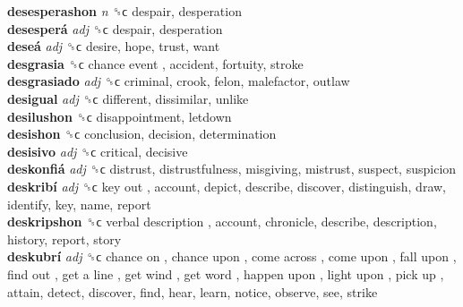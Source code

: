 \textbf{desesperashon} \emph{n}  ␝ϲ  despair, desperation  \\
\textbf{desesperá} \emph{adj}  ␝ϲ  despair, desperation  \\
\textbf{deseá} \emph{adj}  ␝ϲ  desire, hope, trust, want  \\
\textbf{desgrasia} ␝ϲ   chance event , accident, fortuity, stroke  \\
\textbf{desgrasiado} \emph{adj}  ␝ϲ  criminal, crook, felon, malefactor, outlaw  \\
\textbf{desigual} \emph{adj}  ␝ϲ  different, dissimilar, unlike  \\
\textbf{desilushon} ␝ϲ  disappointment, letdown  \\
\textbf{desishon} ␝ϲ  conclusion, decision, determination  \\
\textbf{desisivo} \emph{adj}  ␝ϲ  critical, decisive  \\
\textbf{deskonfiá} \emph{adj}  ␝ϲ  distrust, distrustfulness, misgiving, mistrust, suspect, suspicion  \\
\textbf{deskribí} \emph{adj}  ␝ϲ   key out , account, depict, describe, discover, distinguish, draw, identify, key, name, report  \\
\textbf{deskripshon} ␝ϲ   verbal description , account, chronicle, describe, description, history, report, story  \\
\textbf{deskubrí} \emph{adj}  ␝ϲ   chance on ,  chance upon ,  come across ,  come upon ,  fall upon ,  find out ,  get a line ,  get wind ,  get word ,  happen upon ,  light upon ,  pick up , attain, detect, discover, find, hear, learn, notice, observe, see, strike  \\
